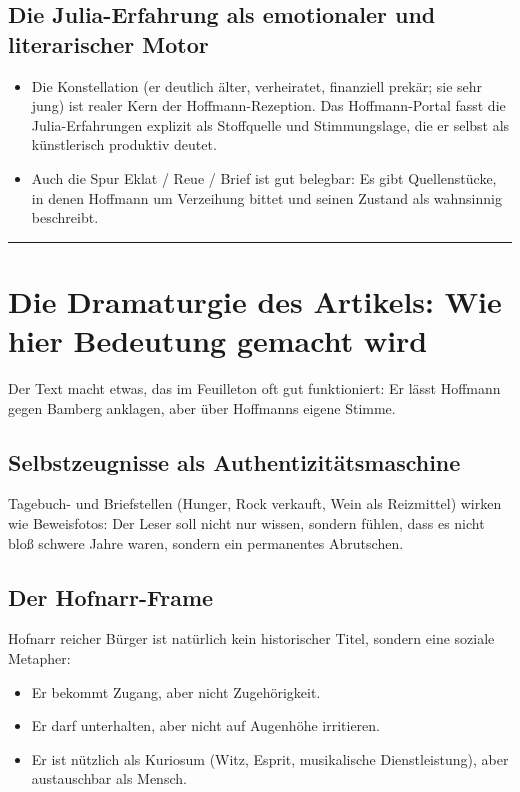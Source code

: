 \documentclass[11pt]{amsart}
\begin{document}
\subsection{Die \glqq Julia\grqq-Erfahrung als emotionaler und literarischer Motor}
\begin{itemize}
  \item Die Konstellation (er deutlich \"alter, verheiratet, finanziell prek\"ar; sie sehr jung) ist realer Kern der Hoffmann-Rezeption. Das Hoffmann-Portal fasst die \glqq Julia-Erfahrungen\grqq{} explizit als Stoffquelle und Stimmungslage, die er selbst als k\"unstlerisch produktiv deutet.
  \item Auch die Spur \glqq Eklat / Reue / Brief\grqq{} ist gut belegbar: Es gibt Quellenst\"ucke, in denen Hoffmann um Verzeihung bittet und seinen Zustand als \glqq wahnsinnig\grqq{} beschreibt.
\end{itemize}

\bigskip
\hrule
\bigskip

\section{Die Dramaturgie des Artikels: Wie hier Bedeutung gemacht wird}

Der Text macht etwas, das im Feuilleton oft gut funktioniert: Er l\"asst Hoffmann gegen Bamberg \glqq anklagen\grqq{}, aber \"uber Hoffmanns eigene Stimme.

\subsection{Selbstzeugnisse als Authentizit\"atsmaschine}
Tagebuch- und Briefstellen (Hunger, \glqq Rock verkauft\grqq, Wein als \glqq Reizmittel\grqq) wirken wie Beweisfotos: Der Leser soll nicht nur wissen, sondern f\"uhlen, dass es nicht blo{\ss} \glqq schwere Jahre\grqq{} waren, sondern ein permanentes Abrutschen.

\subsection{Der \glqq Hofnarr\grqq-Frame}
\glqq Hofnarr reicher B\"urger\grqq{} ist nat\"urlich kein historischer Titel, sondern eine soziale Metapher:
\begin{itemize}
  \item Er bekommt Zugang, aber nicht Zugeh\"origkeit.
  \item Er darf unterhalten, aber nicht auf Augenh\"ohe irritieren.
  \item Er ist n\"utzlich als Kuriosum (Witz, Esprit, musikalische Dienstleistung), aber austauschbar als Mensch.
\end{itemize}
\end{document}
